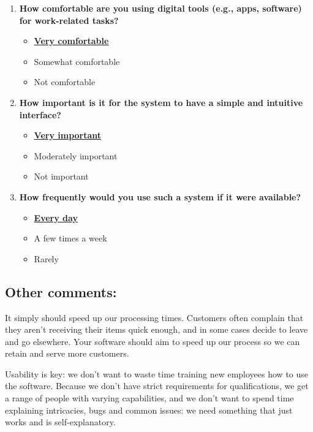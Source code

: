 \begin{enumerate}
    \item \textbf{How comfortable are you using digital tools (e.g., apps, software) for work-related tasks?}
    \begin{itemize}
        \item \textbf{\underline{Very comfortable}}
        \item Somewhat comfortable
        \item Not comfortable
    \end{itemize}

    \item \textbf{How important is it for the system to have a simple and intuitive interface?}
    \begin{itemize}
        \item \textbf{\underline{Very important}}
        \item Moderately important
        \item Not important
    \end{itemize}

    \item \textbf{How frequently would you use such a system if it were available?}
    \begin{itemize}
        \item \textbf{\underline{Every day}}
        \item A few times a week
        \item Rarely
    \end{itemize}
    
\end{enumerate}


\subsection*{Other comments:}

It simply should speed up our processing times. Customers often complain that they aren't receiving their items quick enough, and in some cases decide to leave and go elsewhere. Your software should aim to speed up our process so we can retain and serve more customers.\newline

Usability is key: we don't want to waste time training new employees how to use the software. Because we don't have strict requirements for qualifications, we get a range of people with varying capabilities, and we don't want to spend time explaining intricacies, bugs and common issues: we need something that just works and is self-explanatory.\newline


